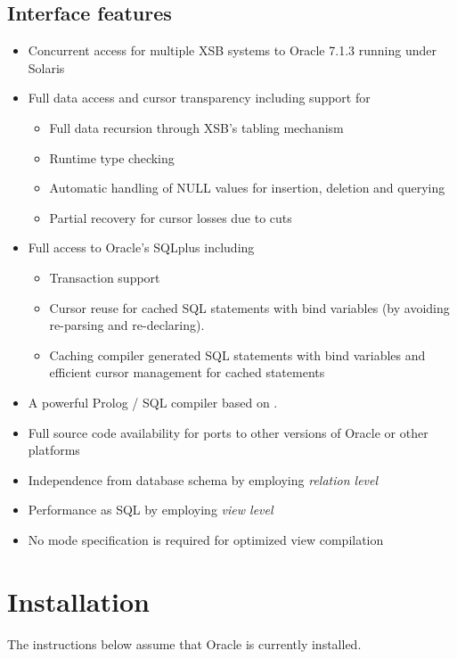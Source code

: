 \subsection{Interface features}
\begin{itemize} 
\item Concurrent access for multiple XSB systems to Oracle 7.1.3
	running under Solaris
\item Full data access and cursor transparency including support for
	\begin{itemize}
	\item Full data recursion through XSB's tabling mechanism
	\item Runtime type checking
	\item Automatic handling of NULL values for insertion, 
		deletion and querying
	\item Partial recovery for cursor losses due to cuts
	\end{itemize}
\item Full access to Oracle's SQLplus including
	\begin{itemize}
	\item Transaction support
	\item Cursor reuse for cached SQL statements 
		with bind variables (by avoiding re-parsing and re-declaring).
	\item Caching compiler generated SQL statements with bind variables 
		and efficient cursor management for cached statements
	\end{itemize}
\item A powerful Prolog / SQL compiler based on \cite{Drax92}.
\item Full source code availability for ports to other versions of
      Oracle or other platforms
\item Independence from database schema by employing {\it relation level}
\item Performance as SQL by employing {\it view level} 
\item No mode specification is required for optimized view compilation
\end{itemize}

\section{Installation}

The instructions below assume that Oracle is currently installed.

